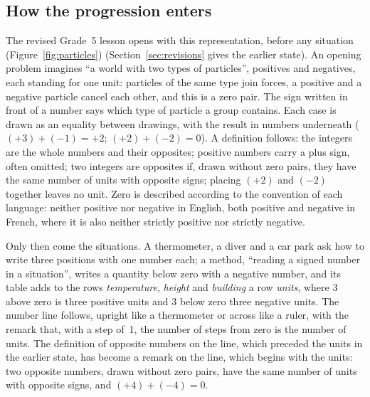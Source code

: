 \documentclass[11pt,a4paper]{article}
\theoremstyle{definition}
\begin{document}
\subsection{How the progression enters}
The revised Grade~5 lesson opens with this representation, before any situation (Figure~\ref{fig:particles}) (Section~\ref{sec:revisions} gives the earlier state). An opening problem imagines ``a world with two types of particles'', positives and negatives, each standing for one unit: particles of the same type join forces, a positive and a negative particle cancel each other, and this is a zero pair. The sign written in front of a number says which type of particle a group contains. Each case is drawn as an equality between drawings, with the result in numbers underneath ($(+3)+(-1)=+2$; $(+2)+(-2)=0$). A definition follows: the integers are the whole numbers and their opposites; positive numbers carry a plus sign, often omitted; two integers are opposites if, drawn without zero pairs, they have the same number of units with opposite signs; placing $(+2)$ and $(-2)$ together leaves no unit. Zero is described according to the convention of each language: neither positive nor negative in English, both positive and negative in French, where it is also neither strictly positive nor strictly negative.

Only then come the situations. A thermometer, a diver and a car park ask how to write three positions with one number each; a method, ``reading a signed number in a situation'', writes a quantity below zero with a negative number, and its table adds to the rows \emph{temperature}, \emph{height} and \emph{building} a row \emph{units}, where $3$ above zero is three positive units and $3$ below zero three negative units. The number line follows, upright like a thermometer or across like a ruler, with the remark that, with a step of~1, the number of steps from zero is the number of units. The definition of opposite numbers on the line, which preceded the units in the earlier state, has become a remark on the line, which begins with the units: two opposite numbers, drawn without zero pairs, have the same number of units with opposite signs, and $(+4)+(-4)=0$.
\end{document}
